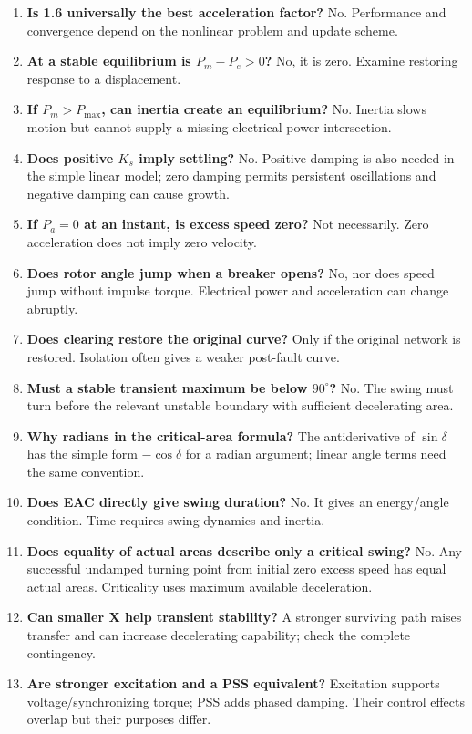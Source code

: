 \documentclass[11pt,a4paper]{article}
\begin{document}
\begin{enumerate}
\item \textbf{Is 1.6 universally the best acceleration factor?} No. Performance and convergence depend on the nonlinear problem and update scheme.
\item \textbf{At a stable equilibrium is $P_m-P_e>0$?} No, it is zero. Examine restoring response to a displacement.
\item \textbf{If $P_m>P_{\max}$, can inertia create an equilibrium?} No. Inertia slows motion but cannot supply a missing electrical-power intersection.
\item \textbf{Does positive $K_s$ imply settling?} No. Positive damping is also needed in the simple linear model; zero damping permits persistent oscillations and negative damping can cause growth.
\item \textbf{If $P_a=0$ at an instant, is excess speed zero?} Not necessarily. Zero acceleration does not imply zero velocity.
\item \textbf{Does rotor angle jump when a breaker opens?} No, nor does speed jump without impulse torque. Electrical power and acceleration can change abruptly.
\item \textbf{Does clearing restore the original curve?} Only if the original network is restored. Isolation often gives a weaker post-fault curve.
\item \textbf{Must a stable transient maximum be below $90^\circ$?} No. The swing must turn before the relevant unstable boundary with sufficient decelerating area.
\item \textbf{Why radians in the critical-area formula?} The antiderivative of $\sin\delta$ has the simple form $-\cos\delta$ for a radian argument; linear angle terms need the same convention.
\item \textbf{Does EAC directly give swing duration?} No. It gives an energy/angle condition. Time requires swing dynamics and inertia.
\item \textbf{Does equality of actual areas describe only a critical swing?} No. Any successful undamped turning point from initial zero excess speed has equal actual areas. Criticality uses maximum available deceleration.
\item \textbf{Can smaller X help transient stability?} A stronger surviving path raises transfer and can increase decelerating capability; check the complete contingency.
\item \textbf{Are stronger excitation and a PSS equivalent?} Excitation supports voltage/synchronizing torque; PSS adds phased damping. Their control effects overlap but their purposes differ.
\end{enumerate}
\end{document}
